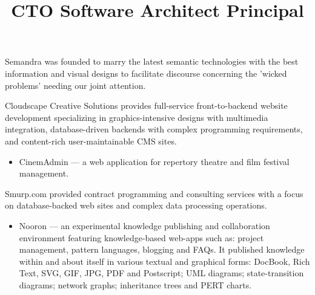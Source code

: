 \begin{resume}


\title{ CTO }
\begin{position}
Semandra was founded to marry the latest semantic technologies 
with the best information and visual designs to facilitate 
discourse concerning the 'wicked problems' needing our joint attention.
\end{position}


\title{ Software Architect }
\begin{position}
Cloudscape Creative Solutions provides full-service front-to-backend
website development specializing in graphics-intensive designs with
multimedia integration, database-driven backends with complex
programming requirements, and content-rich user-maintainable CMS
sites.

\begin{itemize}
  \item CinemAdmin --- a web application for repertory theatre and film festival management.
\end{itemize}

\end{position}


\title{ Principal }

\begin{position}
Smurp.com provided contract programming and consulting services with a focus
on database-backed web sites and complex data processing operations.

\begin{itemize}
  \item Nooron --- an experimental knowledge publishing and collaboration
    environment featuring knowledge-based web-apps such as:
    project management, pattern languages, blogging and FAQs.
    It published knowledge within and about itself in various textual and graphical forms:
    DocBook, Rich Text, SVG, GIF, JPG, PDF and Postscript;
    UML diagrams; state-transition diagrams; network graphs; 
    inheritance trees and PERT charts.


\end{itemize}
\end{position}
\end{resume}
